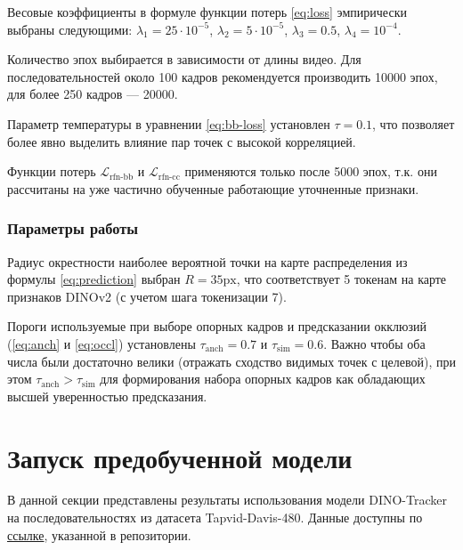\documentclass[a4paper, 14pt]{extarticle}
\theoremstyle{definition}
\theoremstyle{plain}
\theoremstyle{remark}
\begin{document}
Весовые коэффициенты в формуле функции потерь \ref{eq:loss} эмпирически выбраны следующими: $\lambda_1=25\cdot 10^{-5}$, $\lambda_2=5\cdot 10^{-5}$, $\lambda_3=0.5$, $\lambda_4= 10^{-4}$.

Количество эпох выбирается в зависимости от длины видео. Для последовательностей около 100 кадров рекомендуется производить 10000 эпох, для более 250 кадров --- 20000.

Параметр температуры в уравнении \ref{eq:bb-loss} установлен $\tau=0.1$, что позволяет более явно выделить влияние пар точек с высокой корреляцией.

Функции потерь $\mathcal{L}_{\text{rfn-bb}}$ и $\mathcal{L}_{\text{rfn-cc}}$ применяются только после 5000 эпох, т.к. они рассчитаны на уже частично обученные работающие уточненные признаки.

\subsubsection{Параметры работы}
Радиус окрестности наиболее вероятной точки на карте распределения из формулы \ref{eq:prediction} выбран $R=35\text{px}$, что соответствует 5 токенам на карте признаков DINOv2 (с учетом шага токенизации 7).

Пороги используемые при выборе опорных кадров и предсказании окклюзий (\ref{eq:anch} и \ref{eq:occl}) установлены $\tau_{\text{anch}}=0.7$ и $\tau_{\text{sim}}=0.6$. Важно чтобы оба числа были достаточно велики (отражать сходство видимых точек с целевой), при этом $\tau_{\text{anch}} > \tau_{\text{sim}}$ для формирования набора опорных кадров как обладающих высшей уверенностью предсказания.

\newpage

\section{Запуск предобученной модели}
В данной секции представлены результаты использования модели DINO-Tracker на последовательностях из датасета 
Tapvid-Davis-480. Данные доступны по \href{https://www.dropbox.com/scl/fo/7s2rgsm92qbzzh2xnx51d/AIvXxRaJPL2RQm43Zi_taJU?e=1&preview=davis_480.zip&rlkey=6cs0bm2u0on1u7z0jyxlq8avq&st=7s75r77a&dl=0}{ссылке}, указанной в репозитории.
\end{document}
